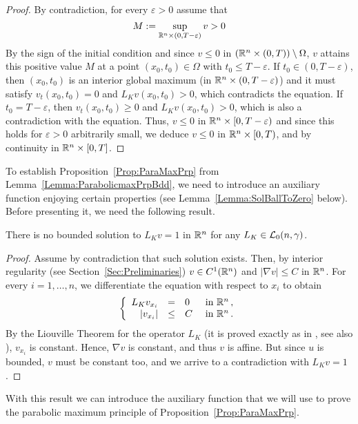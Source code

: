 \begin{proof}
By contradiction, for every $\varepsilon > 0$ assume that 
$$
M:=\sup_{\mathbb{R}^n \times (0,T-\varepsilon)}v > 0
$$
By the sign of the initial condition and since $v \leq 0 $ in $(\mathbb{R}^n \times (0,T))\setminus \Omega$, $v$  attains this positive value $M$ at a point $(x_0,t_0) \in \Omega$ with $t_0\leq T-\varepsilon$. If $t_0\in(0,T-\varepsilon)$, then $(x_0,t_0)$ is an interior global maximum (in $\mathbb{R}^n \times (0,T-\varepsilon)$) and it must satisfy $v_t(x_0,t_0)=0$ and $L_K v(x_0,t_0)>0$, which contradicts the equation. If $t_0 = T-\varepsilon$, then $v_t(x_0,t_0)\geq 0$ and $L_K v(x_0,t_0)>0$, which is also a contradiction with the equation. Thus, $v\leq 0$ in $\mathbb{R}^n\times [0,T-\varepsilon)$ and since this holds for $\varepsilon>0$ arbitrarily small, we deduce $v\leq 0$ in $\mathbb{R}^n\times [0,T)$, and by continuity in $\mathbb{R}^n\times [0,T]$.
\end{proof}

To establish Proposition~\ref{Prop:ParaMaxPrp} from Lemma~\ref{Lemma:ParabolicmaxPrpBdd}, we need to introduce an auxiliary function enjoying certain properties (see Lemma~\ref{Lemma:SolBallToZero} below). Before presenting it, we need the following result.

\begin{lemma}
\label{Lemma:NoBddSolL=1}
There is no bounded solution to $L_K v=1$ in $\mathbb{R}^n$ for any $L_K \in \mathcal{L}_0(n,\gamma)$.
\end{lemma}

\begin{proof}
Assume by contradiction that such solution exists. Then, by interior regularity (see Section~\ref{Sec:Preliminaries}) $v\in C^1(\mathbb{R}^n)$ and $|\nabla v|\leq C$ in $\mathbb{R}^n$. For every $i = 1,\ldots, n$, we differentiate the equation with respect to $x_i$ to obtain
\begin{equation*}
\left\{\begin{array}{rcll}
L_K  v_{x_i} &=& 0 & \textrm{ in } \mathbb{R}^n\,,\\
|v_{x_i}| &\leq& C & \textrm{ in } \mathbb{R}^n\,.
\end{array} \right.
\end{equation*}
By the Liouville Theorem for the operator $L_K $ (it is proved exactly as in \cite{RosOtonSerra-Stable}, see also \cite{SerraC2s+alphaRegularity}), $v_{x_i}$ is constant. Hence, $\nabla v$ is constant, and thus $v$ is affine. But since $u$ is bounded, $v$ must be constant too, and we arrive to a contradiction with $L_K v=1$.
\end{proof}

With this result we can introduce the auxiliary function that we will use to prove the parabolic maximum principle of Proposition~\ref{Prop:ParaMaxPrp}.

